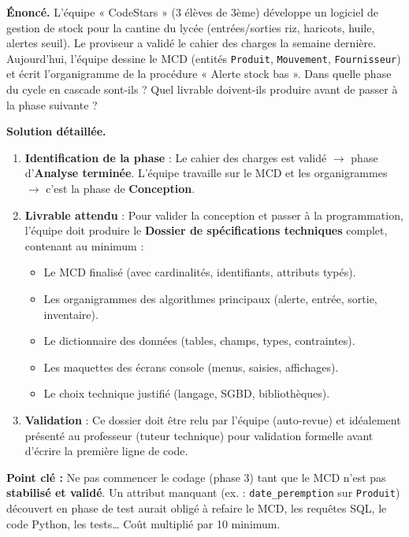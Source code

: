 \documentclass[11pt]{article}
\begin{document}
\begin{exoresolu}
\textbf{Énoncé.} L'équipe « CodeStars » (3 élèves de 3ème) développe un logiciel de gestion de stock pour la cantine du lycée (entrées/sorties riz, haricots, huile, alertes seuil). Le proviseur a validé le cahier des charges la semaine dernière. Aujourd'hui, l'équipe dessine le MCD (entités \texttt{Produit}, \texttt{Mouvement}, \texttt{Fournisseur}) et écrit l'organigramme de la procédure « Alerte stock bas ». Dans quelle phase du cycle en cascade sont-ils ? Quel livrable doivent-ils produire avant de passer à la phase suivante ?

\textbf{Solution détaillée.}
\begin{enumerate}
    \item \textbf{Identification de la phase} : Le cahier des charges est validé $\rightarrow$ phase d'\textbf{Analyse terminée}. L'équipe travaille sur le MCD et les organigrammes $\rightarrow$ c'est la phase de \textbf{Conception}.
    \item \textbf{Livrable attendu} : Pour valider la conception et passer à la programmation, l'équipe doit produire le \textbf{Dossier de spécifications techniques} complet, contenant au minimum :
    \begin{itemize}
        \item Le MCD finalisé (avec cardinalités, identifiants, attributs typés).
        \item Les organigrammes des algorithmes principaux (alerte, entrée, sortie, inventaire).
        \item Le dictionnaire des données (tables, champs, types, contraintes).
        \item Les maquettes des écrans console (menus, saisies, affichages).
        \item Le choix technique justifié (langage, SGBD, bibliothèques).
    \end{itemize}
    \item \textbf{Validation} : Ce dossier doit être relu par l'équipe (auto-revue) et idéalement présenté au professeur (tuteur technique) pour validation formelle avant d'écrire la première ligne de code.
\end{enumerate}
\textbf{Point clé :} Ne pas commencer le codage (phase 3) tant que le MCD n'est pas \textbf{stabilisé et validé}. Un attribut manquant (ex. : \texttt{date\_peremption} sur \texttt{Produit}) découvert en phase de test aurait obligé à refaire le MCD, les requêtes SQL, le code Python, les tests… Coût multiplié par 10 minimum.
\end{exoresolu}
\end{document}
